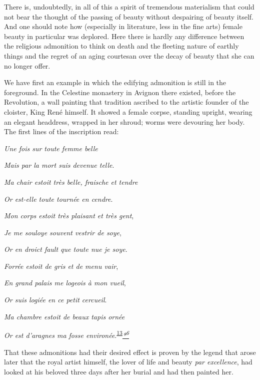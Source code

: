 There is, undoubtedly, in all of this a spirit of tremendous materialism
that could not bear the thought of the passing of beauty without
despairing of beauty itself. And one should note how (especially in
literature, less in the fine arts) female beauty in particular was
deplored. Here there is hardly any difference between the religious
admonition to think on death and the fleeting nature of earthly things
and the regret of an aging courtesan over the decay of beauty that she
can no longer offer.

We have first an example in which the edifying admonition is
\protect\hypertarget{12_Chapter_Five__THE_VISION_OF_DEAT.xhtmlux5cux23page_161}{}{}still
in the foreground. In the Celestine monastery in Avignon there existed,
before the Revolution, a wall painting that tradition ascribed to the
artistic founder of the cloister, King René himself. It showed a female
corpse, standing upright, wearing an elegant headdress, wrapped in her
shroud; worms were devouring her body. The first lines of the
inscription read:

\emph{Une fois sur toute femme belle}

\emph{Mais par la mort suis devenue telle}.

\emph{Ma chair estoit très belle, fraische et tendre}

\emph{Or est-elle toute tournée en cendre}.

\emph{Mon corps estoit très plaisant et très gent},

\emph{Je me souloye souvent vestrir de soye},

\emph{Or en droict fault que toute nue je soye}.

\emph{Forrée estoit de gris et de menu vair},

\emph{En grand palais me logeois à mon vueil},

\emph{Or suis logiée en ce petit cercueil}.

\emph{Ma chambre estoit de beaux tapis ornée}

\emph{Or est d'aragnes ma fosse
environée}.\textsuperscript{\protect\hypertarget{12_Chapter_Five__THE_VISION_OF_DEAT.xhtmlux5cux23id_1326}{\protect\hyperlink{23_NOTES.xhtmlux5cux23page_415}{13}}}\emph{\protect\hypertarget{12_Chapter_Five__THE_VISION_OF_DEAT.xhtmlux5cux23id_2961}{\protect\hyperlink{23_NOTES.xhtmlux5cux23id_2962}{*\textsuperscript{6}}}}

That these admonitions had their desired effect is proven by the legend
that arose later that the royal artist himself, the lover of life and
beauty \emph{par excellence}, had looked at his beloved three days after
her burial and had then painted her.

